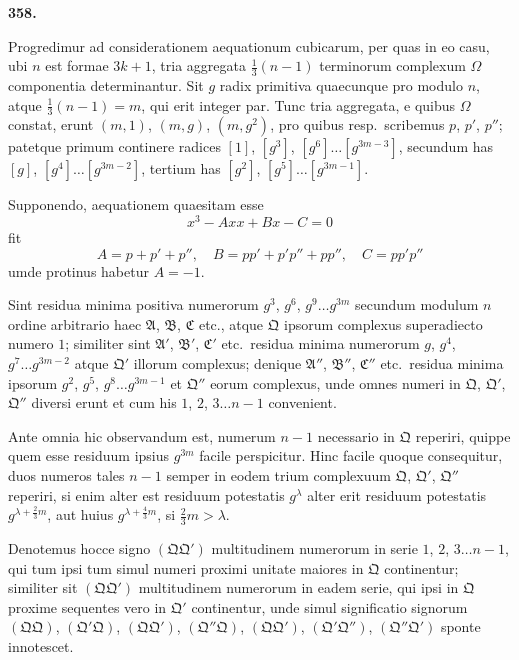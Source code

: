 \documentclass[12pt,a4paper]{article}
\theoremstyle{plain}
\theoremstyle{definition}
\theoremstyle{remark}
\begin{document}
\begin{center}
\textbf{358.}
\end{center}

Progredimur ad considerationem aequationum cubicarum, per quas in eo casu, ubi $n$ est formae $3k+1$, tria aggregata $\tfrac{1}{3}(n-1)$ terminorum complexum $\Omega$ componentia determinantur. Sit $g$ radix primitiva quaecunque pro modulo $n$, atque $\tfrac{1}{3}(n-1) = m$, qui erit integer par. Tunc tria aggregata, e quibus $\Omega$ constat, erunt $(m,1)$, $(m,g)$, $(m,g^2)$, pro quibus resp.\ scribemus $p$, $p'$, $p''$; patetque primum continere radices $[1]$, $[g^3]$, $[g^6] \ldots [g^{3m-3}]$, secundum has $[g]$, $[g^4] \ldots [g^{3m-2}]$, tertium has $[g^2]$, $[g^5] \ldots [g^{3m-1}]$.

Supponendo, aequationem quaesitam esse
\[x^3 - Axx + Bx - C = 0\]
fit
\[A = p + p' + p'', \quad B = pp' + p'p'' + pp'', \quad C = pp'p''\]
umde protinus habetur $A = -1$.

Sint residua minima positiva numerorum $g^3$, $g^6$, $g^9 \ldots g^{3m}$ secundum modulum $n$ ordine arbitrario haec $\mathfrak{A}$, $\mathfrak{B}$, $\mathfrak{C}$ etc., atque $\mathfrak{Q}$ ipsorum complexus superadiecto numero $1$; similiter sint $\mathfrak{A}'$, $\mathfrak{B}'$, $\mathfrak{C}'$ etc.\ residua minima numerorum $g$, $g^4$, $g^7 \ldots g^{3m-2}$ atque $\mathfrak{Q}'$ illorum complexus; denique $\mathfrak{A}''$, $\mathfrak{B}''$, $\mathfrak{C}''$ etc.\ residua minima ipsorum $g^2$, $g^5$, $g^8 \ldots g^{3m-1}$ et $\mathfrak{Q}''$ eorum complexus, unde omnes numeri in $\mathfrak{Q}$, $\mathfrak{Q}'$, $\mathfrak{Q}''$ diversi erunt et cum his $1$, $2$, $3 \ldots n-1$ convenient.

Ante omnia hic observandum est, numerum $n-1$ necessario in $\mathfrak{Q}$ reperiri, quippe quem esse residuum ipsius $g^{3m}$ facile perspicitur. Hinc facile quoque consequitur, duos numeros tales $n-1$ semper in eodem trium complexuum $\mathfrak{Q}$, $\mathfrak{Q}'$, $\mathfrak{Q}''$ reperiri, si enim alter est residuum potestatis $g^\lambda$ alter erit residuum potestatis $g^{\lambda + \frac{2}{3}m}$, aut huius $g^{\lambda + \frac{4}{3}m}$, si $\tfrac{2}{3}m > \lambda$.

Denotemus hocce signo $(\mathfrak{Q}\mathfrak{Q}')$ multitudinem numerorum in serie $1$, $2$, $3 \ldots n-1$, qui tum ipsi tum simul numeri proximi unitate maiores in $\mathfrak{Q}$ continentur; similiter sit $(\mathfrak{Q}\mathfrak{Q}')$ multitudinem numerorum in eadem serie, qui ipsi in $\mathfrak{Q}$ proxime sequentes vero in $\mathfrak{Q}'$ continentur, unde simul significatio signorum $(\mathfrak{Q}\mathfrak{Q})$, $(\mathfrak{Q}'\mathfrak{Q})$, $(\mathfrak{Q}\mathfrak{Q}')$, $(\mathfrak{Q}''\mathfrak{Q})$, $(\mathfrak{Q}\mathfrak{Q}')$, $(\mathfrak{Q}'\mathfrak{Q}'')$, $(\mathfrak{Q}''\mathfrak{Q}')$ sponte innotescet.
\end{document}
